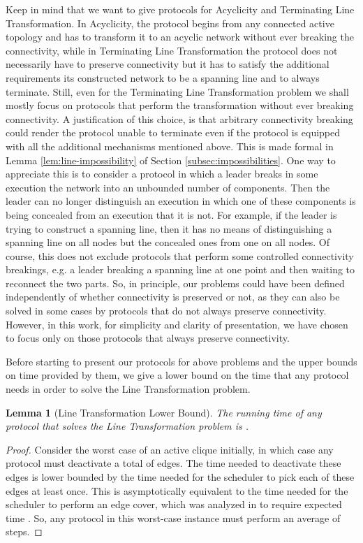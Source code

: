 \documentclass[preprint]{elsarticle}
\newtheorem{lemma}{Lemma}
\begin{document}
Keep in mind that we want to give protocols for Acyclicity and Terminating Line Transformation. In Acyclicity, the protocol begins from any connected active topology and has to transform it to an acyclic network without ever breaking the connectivity, while in Terminating Line Transformation the protocol does not necessarily have to preserve connectivity but it has to satisfy the additional requirements its constructed network to be a spanning line and to always terminate. Still, even for the Terminating Line Transformation problem we shall mostly focus on protocols that perform the transformation without ever breaking connectivity. A justification of this choice, is that arbitrary connectivity breaking could render the protocol unable to terminate even if the protocol is equipped with all the additional mechanisms mentioned above. This is made formal in Lemma \ref{lem:line-impossibility} of Section \ref{subsec:impossibilities}. One way to appreciate this is to consider a protocol in which a leader breaks in some execution the network into an unbounded number of components. Then the leader can no longer distinguish an execution in which one of these components is being concealed from an execution that it is not. For example, if the leader is trying to construct a spanning line, then it has no means of distinguishing a spanning line on all nodes but the concealed ones from one on all nodes. Of course, this does not exclude protocols that perform some controlled connectivity breakings, e.g. a leader breaking a spanning line at one point and then waiting to reconnect the two parts. So, in principle, our problems could have been defined independently of whether connectivity is preserved or not, as they can also be solved in some cases by protocols that do not always preserve connectivity. However, in this work, for simplicity and clarity of presentation, we have chosen to focus only on those protocols that always preserve connectivity.

Before starting to present our protocols for above problems and the upper bounds on time provided by them, we give a lower bound on the time that any protocol needs in order to solve the Line Transformation problem.

\begin{lemma} [Line Transformation Lower Bound] \label{lem:line-lower-bound}
The running time of any protocol that solves the Line Transformation problem is .
\end{lemma}
\begin{proof} 
Consider the worst case of an active clique initially, in which case any protocol must deactivate a total of  edges. The time needed to deactivate these edges is lower bounded by the time needed for the scheduler to pick each of these edges at least once. This is asymptotically equivalent to the time needed for the scheduler to perform an edge cover, which was analyzed in \cite{MS14} to require expected time . So, any protocol in this worst-case instance must perform an average of  steps.  
\end{proof}
\end{document}
